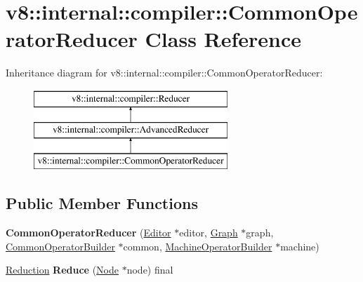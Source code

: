 \hypertarget{classv8_1_1internal_1_1compiler_1_1_common_operator_reducer}{}\section{v8\+:\+:internal\+:\+:compiler\+:\+:Common\+Operator\+Reducer Class Reference}
\label{classv8_1_1internal_1_1compiler_1_1_common_operator_reducer}
Inheritance diagram for v8\+:\+:internal\+:\+:compiler\+:\+:Common\+Operator\+Reducer\+:\begin{figure}[H]
\begin{center}
\leavevmode
\includegraphics[height=3.000000cm]{classv8_1_1internal_1_1compiler_1_1_common_operator_reducer}
\end{center}
\end{figure}
\subsection*{Public Member Functions}
\begin{DoxyCompactItemize}
\item 
{\bfseries Common\+Operator\+Reducer} (\hyperlink{classv8_1_1internal_1_1compiler_1_1_advanced_reducer_1_1_editor}{Editor} $\ast$editor, \hyperlink{classv8_1_1internal_1_1compiler_1_1_graph}{Graph} $\ast$graph, \hyperlink{classv8_1_1internal_1_1compiler_1_1_common_operator_builder}{Common\+Operator\+Builder} $\ast$common, \hyperlink{classv8_1_1internal_1_1compiler_1_1_machine_operator_builder}{Machine\+Operator\+Builder} $\ast$machine)\hypertarget{classv8_1_1internal_1_1compiler_1_1_common_operator_reducer_a8691be013fff64b115abb50fee3b7d1a}{}\label{classv8_1_1internal_1_1compiler_1_1_common_operator_reducer_a8691be013fff64b115abb50fee3b7d1a}

\item 
\hyperlink{classv8_1_1internal_1_1compiler_1_1_reduction}{Reduction} {\bfseries Reduce} (\hyperlink{classv8_1_1internal_1_1compiler_1_1_node}{Node} $\ast$node) final\hypertarget{classv8_1_1internal_1_1compiler_1_1_common_operator_reducer_ac6eeb8559d70bb7886bea714a65f911d}{}\label{classv8_1_1internal_1_1compiler_1_1_common_operator_reducer_ac6eeb8559d70bb7886bea714a65f911d}

\end{DoxyCompactItemize}
